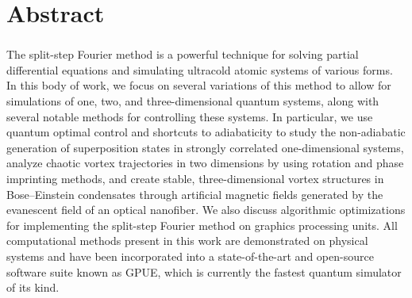 \chapter*{Abstract} 
\subsection*{\thesistitle}

The split-step Fourier method is a powerful technique for solving partial differential equations and simulating ultracold atomic systems of various forms.
In this body of work, we focus on several variations of this method to allow for simulations of one, two, and three-dimensional quantum systems, along with several notable methods for controlling these systems.
In particular, we use quantum optimal control and shortcuts to adiabaticity to study the non-adiabatic generation of superposition states in strongly correlated one-dimensional systems, analyze chaotic vortex trajectories in two dimensions by using rotation and phase imprinting methods, and create stable, three-dimensional vortex structures in Bose--Einstein condensates through artificial magnetic fields generated by the evanescent field of an optical nanofiber.
We also discuss algorithmic optimizations for implementing the split-step Fourier method on graphics processing units.
All computational methods present in this work are demonstrated on physical systems and have been incorporated into a state-of-the-art and open-source software suite known as GPUE, which is currently the fastest quantum simulator of its kind.
